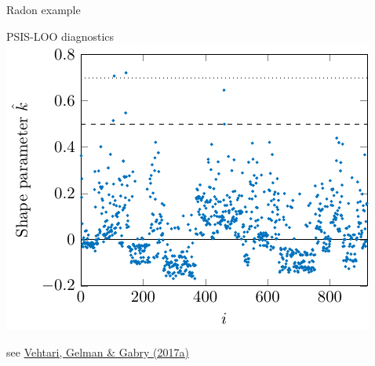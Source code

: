 \documentclass[english,t]{beamer}
\begin{document}
\begin{frame}
  
   {\Large\color{navyblue} Radon example}

   PSIS-LOO diagnostics
   \includegraphics[width=.8\textwidth]{radon1k.pdf}

{\small see \href{http://link.springer.com/article/10.1007/s11222-016-9696-4}{Vehtari, Gelman \& Gabry (2017a)}}
   
 \end{frame}
\end{document}
